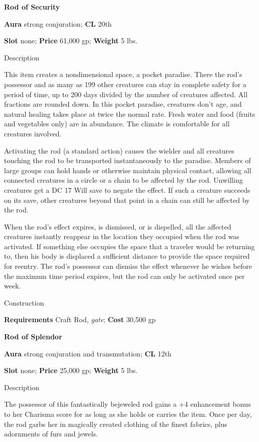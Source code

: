 \textbf{Rod of Security}
				
\textbf{Aura} strong conjuration;\textbf{ CL }20th
				
\textbf{Slot} none; \textbf{Price} 61,000 gp; \textbf{Weight} 5 lbs.
				
Description
				
This item creates a nondimensional space, a pocket paradise. There the rod's possessor and as many as 199 other creatures can stay in complete safety for a period of time, up to 200 days divided by the number of creatures affected. All fractions are rounded down. In this pocket paradise, creatures don't age, and natural healing takes place at twice the normal rate. Fresh water and food (fruits and vegetables only) are in abundance. The climate is comfortable for all creatures involved.
				
Activating the rod (a standard action) causes the wielder and all creatures touching the rod to be transported instantaneously to the paradise. Members of large groups can hold hands or otherwise maintain physical contact, allowing all connected creatures in a circle or a chain to be affected by the rod. Unwilling creatures get a DC 17 Will save to negate the effect. If such a creature succeeds on its save, other creatures beyond that point in a chain can still be affected by the rod.
				
When the rod's effect expires, is dismissed, or is dispelled, all the affected creatures instantly reappear in the location they occupied when the rod was activated. If something else occupies the space that a traveler would be returning to, then his body is displaced a sufficient distance to provide the space required for reentry. The rod's possessor can dismiss the effect whenever he wishes before the maximum time period expires, but the rod can only be activated once per week. 
				
Construction
				
\textbf{Requirements} Craft Rod, \textit{gate}; \textbf{Cost }30,500 gp
				
\textbf{Rod of Splendor}
				
\textbf{Aura} strong conjuration and transmutation;\textbf{ CL }12th
				
\textbf{Slot} none; \textbf{Price} 25,000 gp; \textbf{Weight} 5 lbs.
				
Description
				
The possessor of this fantastically bejeweled rod gains a +4 enhancement bonus to her Charisma score for as long as she holds or carries the item. Once per day, the rod garbs her in magically created clothing of the finest fabrics, plus adornments of furs and jewels. 
				
